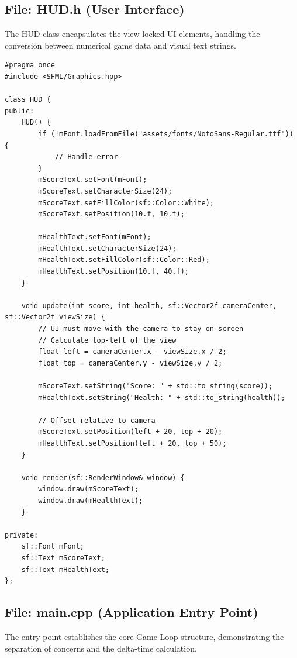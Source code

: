 \documentclass[10pt, a4paper]{article}
\begin{document}
\newpage

\subsection{File: HUD.h (User Interface)}
The HUD class encapsulates the view-locked UI elements, handling the conversion between numerical game data and visual text strings.

\begin{lstlisting}[style=cppstyle, caption={HUD.h}]
#pragma once
#include <SFML/Graphics.hpp>

class HUD {
public:
    HUD() {
        if (!mFont.loadFromFile("assets/fonts/NotoSans-Regular.ttf")) {
            // Handle error
        }
        mScoreText.setFont(mFont);
        mScoreText.setCharacterSize(24);
        mScoreText.setFillColor(sf::Color::White);
        mScoreText.setPosition(10.f, 10.f);
        
        mHealthText.setFont(mFont);
        mHealthText.setCharacterSize(24);
        mHealthText.setFillColor(sf::Color::Red);
        mHealthText.setPosition(10.f, 40.f);
    }

    void update(int score, int health, sf::Vector2f cameraCenter, sf::Vector2f viewSize) {
        // UI must move with the camera to stay on screen
        // Calculate top-left of the view
        float left = cameraCenter.x - viewSize.x / 2;
        float top = cameraCenter.y - viewSize.y / 2;

        mScoreText.setString("Score: " + std::to_string(score));
        mHealthText.setString("Health: " + std::to_string(health));

        // Offset relative to camera
        mScoreText.setPosition(left + 20, top + 20);
        mHealthText.setPosition(left + 20, top + 50);
    }

    void render(sf::RenderWindow& window) {
        window.draw(mScoreText);
        window.draw(mHealthText);
    }

private:
    sf::Font mFont;
    sf::Text mScoreText;
    sf::Text mHealthText;
};
\end{lstlisting}

\newpage

\subsection{File: main.cpp (Application Entry Point)}
The entry point establishes the core Game Loop structure, demonstrating the separation of concerns and the delta-time calculation.
\end{document}
